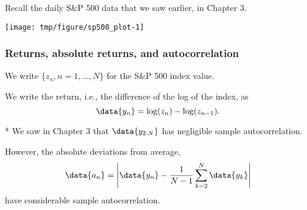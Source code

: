 \begin{frame}[fragile]

\bi

\item Recall the daily S\&P 500 data that we saw earlier, in Chapter 3.

\ei

\begin{knitrout}\small
{}\color{fgcolor}\begin{kframe}
\begin{alltt}
 \hlkwb{<-} \hldef{(}\hldef{,}\hldef{=}\hldef{,}\hldef{=}\hldef{)}
\hldef{(}\hlopt{$}\hlopt{$}
  \hldef{=}\hldef{,}\hldef{=}\hldef{,}\hldef{=}\hldef{)}
\hldef{(}\hlopt{$}\hlopt{$} \hldef{=}\hldef{,}
  \hldef{=}\hldef{,}\hldef{=}\hldef{,}\hldef{=}\hldef{)}
\end{alltt}
\end{kframe}
\end{knitrout}

\vspace{-2mm}

\begin{knitrout}\small
{}\color{fgcolor}

{\centering \texttt{[image: tmp/figure/sp500\_plot-1]} 

}


\end{knitrout}

\end{frame}

\begin{frame}[fragile]

\frametitle{Returns, absolute returns, and autocorrelation}

\bi

\item We write $\{{z}_n,n=1,\dots,N\}$ for the S\&P 500 index value.

\item We write the return, i.e., the difference of the log of the index, as
$$ \data{y_n}=\log({z_n})-\log({z_{n-1}}).$$

* We saw in Chapter 3 that $\data{y_{2:N}}$ has negligible sample autocorrelation.

\item However, the absolute deviations from average, 
$$ \data{a_n} = \left| \data{y_n} - \frac{1}{N-1}\sum_{k=2}^N \data{y_k} \right|$$
have considerable sample autocorrelation.

\ei

\end{frame}

